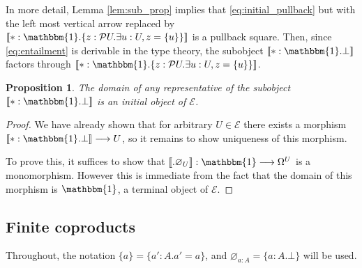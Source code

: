 \documentclass{birkjour}
\theoremstyle{plain}
\newtheorem{proposition}[thm]{Proposition}
\theoremstyle{definition}
\newcommand{\call}[1]{\mathcal{#1}}
\newcommand{\lto}{\longrightarrow}
\begin{document}
	In more detail, Lemma \ref{lem:sub_prop} implies that \eqref{eq:initial_pullback} but with the left most vertical arrow replaced by $\llbracket \ast:\mathbbm{1}. \lbrace z: \call{P}U . \exists u:U, z = \lbrace u \rbrace \rbrace\rrbracket$ is a pullback square. Then, since \eqref{eq:entailment} is derivable in the type theory, the subobject $\llbracket \ast:\mathbbm{1}. \bot\rrbracket$ factors through $\llbracket \ast:\mathbbm{1}. \lbrace z: \call{P}U . \exists u:U, z = \lbrace u \rbrace \rbrace\rrbracket$.
	\begin{proposition}\label{prop:initial}
		The domain of any representative of the subobject $\llbracket \ast: \mathbbm{1} . \bot \rrbracket$ is an initial object of $\call{E}$.
	\end{proposition}
	\begin{proof}
		We have already shown that for arbitrary $U \in \call{E}$ there exists a morphism $\llbracket \ast : \mathbbm{1} . \bot \rrbracket \lto U$, so it remains to show uniqueness of this morphism.
		
		To prove this, it suffices to show that $\llbracket . \varnothing_U\rrbracket: \mathbbm{1} \lto \Omega^U$ is a monomorphism. However this is immediate from the fact that the domain of this morphism is $\mathbbm{1}$, a terminal object of $\call{E}$.
	\end{proof}
	
	\subsection{Finite coproducts}\label{sec:coproducts}
	Throughout, the notation $\lbrace a \rbrace = \lbrace a' : A. a' = a\rbrace$, and $\varnothing_{a:A} = \lbrace a:A . \bot\rbrace$ will be used.
	
\end{document}
